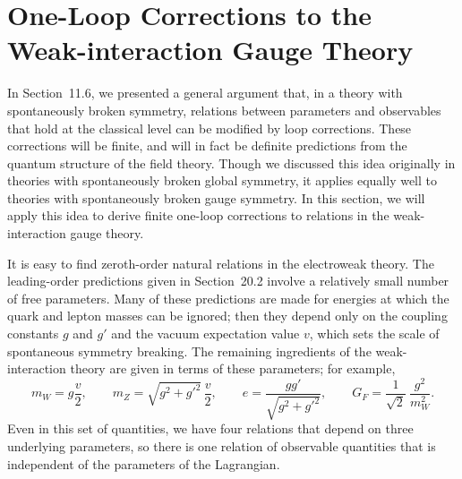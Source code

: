 \section{One-Loop Corrections to the Weak-interaction Gauge Theory}

In Section~11.6, we presented a general argument that, in a theory with
spontaneously broken symmetry, relations between parameters and observables
that hold at the classical level can be modified by loop corrections.  These
corrections will be finite, and will in fact be definite predictions from the
quantum structure of the field theory.  Though we discussed this idea
originally in theories with spontaneously broken global symmetry, it applies
equally well to theories with spontaneously broken gauge symmetry.  In this
section, we will apply this idea to derive finite one-loop corrections to
relations in the weak-interaction gauge theory.

It is easy to find zeroth-order natural relations in the electroweak theory.
The leading-order predictions given in Section~20.2 involve a relatively
small number of free parameters.  Many of these predictions are made for
energies at which the quark and lepton masses can be ignored; then they
depend only on the coupling constants $g$ and $g'$ and the vacuum
expectation value $v$, which sets the scale of spontaneous symmetry breaking.
The remaining ingredients of the weak-interaction theory are given in terms
of these parameters; for example,
\begin{equation}
  m_W = g\frac{v}{2},\qquad
  m_Z = \sqrt{g^2 + g'^2}\,\frac{v}{2},\qquad
  e = \frac{gg'}{\sqrt{g^2+g'^2}},\qquad
  G_F = \frac{1}{\sqrt{2}}\ \frac{g^2}{m_W^2} .
  \label{eq:21.109}
\end{equation}
Even in this set of quantities, we have four relations that depend on three
underlying parameters, so there is one relation of observable quantities
that is independent of the parameters of the Lagrangian.

